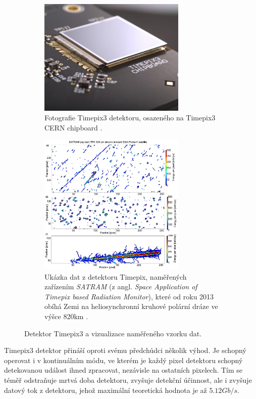 \begin{figure}[bh]
    \begin{center}
        \begin{subfigure}{7.0cm}
            \includegraphics[width=7cm]{figures/timepix3.jpg}    
            \caption{Fotografie Timepix3 detektoru, osazeného na Timepix3 CERN chipboard \cite{medipix_from_medical_img_to_space}.}
        \end{subfigure}
        \hspace{0.1cm}
        \begin{subfigure}{7.0cm}
            \includegraphics[width=7cm]{figures/timepix_data_satram.png}    
            \caption{Ukázka dat z detektoru Timepix, naměřených zařízením \textit{SATRAM} (z angl. \textit{Space Application of Timepix based Radiation Monitor}), které od roku 2013 obíhá Zemi na heliosynchronní kruhové polární dráze ve výšce \unit{820}{km} \cite{PlatkevicDisertace}.}
        \end{subfigure}
	\end{center}
    \caption{Detektor Timepix3 a vizualizace naměřeného vzorku dat.}
	\label{fig:master:frontend:detector_detail}
\end{figure}

Timepix3 detektor přináší oproti svému předchůdci několik výhod. Je schopný operovat i v kontinuálním módu, ve kterém je každý pixel detektoru schopný detekovanou událost ihned zpracovat, nezávisle na ostatních pixelech. Tím se téměř odstraňuje mrtvá doba detektoru, zvyšuje detekční účinnost, ale i zvyšuje datový tok z detektoru, jehož maximální teoretická hodnota je až $5.12 Gb/s$.

